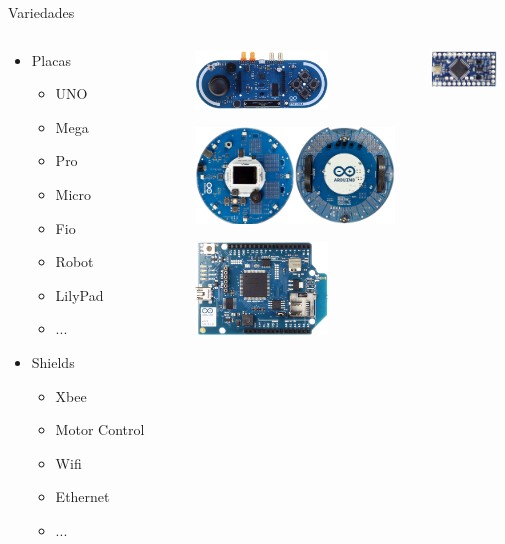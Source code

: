\documentclass{beamer}
\begin{document}
\begin{frame}{Variedades}

\begin{columns}
\begin{column}{0.25\textwidth}
\begin{itemize}
\item Placas
\begin{itemize}
\item UNO
\item Mega
\item Pro
\item Micro
\item Fio
\item Robot
\item LilyPad
\item ...
\end{itemize}
\item Shields
\begin{itemize}
\item Xbee
\item Motor Control
\item Wifi
\item Ethernet
\item ...
\end{itemize}
\end{itemize}
\end{column}

\begin{column}{0.75\textwidth}
\begin{columns}
\begin{column}{0.55\textwidth}
\begin{center}
\includegraphics[width=100pt]{./img/arduino_esplora.png}


\includegraphics[width=150pt]{./img/arduino_robot.png}


\includegraphics[width=100pt]{./img/shield_wifi.png}
\end{center}
\end{column}
\begin{column}{0.2\textwidth}
\begin{center}
\includegraphics[width=50pt]{./img/arduino_pro_mini.png}



\end{center}
\end{column}
\end{columns}
\end{column}
\end{columns}
\end{frame}
\end{document}

